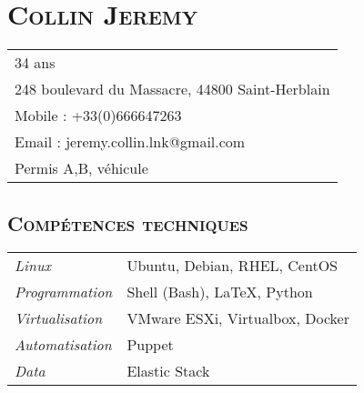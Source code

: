 \documentclass[a4paper]{article}
\newcommand{\hsection}[1]{\section*{\fontfamily{phv}\selectfont\textsc{#1}}}
\newcommand{\hsubsection}[1]{\subsection*{\fontfamily{phv}\selectfont\textsc{#1}}}
\begin{document}
\selectfont
\hsection{Collin Jeremy}
\begin{tabular}{p{16.5cm}}
\hline
34 ans\\
248 boulevard du Massacre, 44800 Saint-Herblain\\
Mobile : +33(0)666647263\\
Email : jeremy.collin.lnk@gmail.com\\
Permis A,B, véhicule\\
\end{tabular}

\hsubsection{Compétences techniques}
\begin{tabular}{P{3.5cm}|p{13cm}}
\textsl{Linux}			& Ubuntu, Debian, RHEL, CentOS\\
\textsl{Programmation}		& Shell (Bash), \LaTeX, Python\\
\textsl{Virtualisation}		& VMware ESXi, Virtualbox, Docker\\
\textsl{Automatisation}		& Puppet\\
\textsl{Data}			& Elastic Stack\\
\end{tabular}
\end{document}
